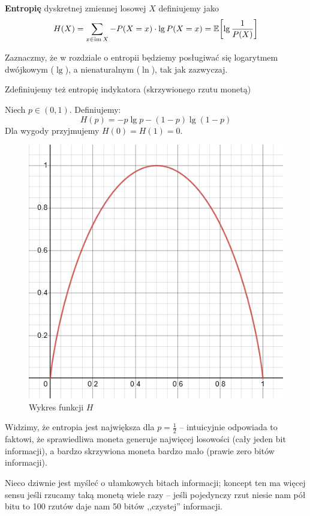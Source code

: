 \begin{definition}
	\textbf{Entropię} dyskretnej zmiennej losowej \( X\) definiujemy jako
	\[
		H(X) = \sum_{x \in \im X} -P(X = x) \cdot \lg P(X = x) = \expected{\lg \frac{1}{P(X)}}
	\]
\end{definition}
Zaznaczmy, że w rozdziale o entropii będziemy posługiwać się logarytmem dwójkowym (\( \lg \)), a nienaturalnym (\( \ln \)), tak jak zazwyczaj.

Zdefiniujemy też entropię indykatora (skrzywionego rzutu monetą)
\begin{definition}
	Niech \( p \in (0, 1) \). Definiujemy:
	\[
		H(p) = -p \lg p - (1-p) \lg (1-p)
	\]
	Dla wygody przyjmujemy \( H(0) = H(1) = 0 \).
\end{definition}
\begin{figure}[H]
	\centering
	\includegraphics[scale=0.5]{img/entropy/entropy-plot.png}
	\caption{Wykres funkcji \( H \)}
\end{figure}

Widzimy, że entropia jest największa dla \(p = \frac{1}{2} \) -- intuicyjnie odpowiada to faktowi, że sprawiedliwa moneta generuje najwięcej losowości (cały jeden bit informacji), a bardzo skrzywiona moneta bardzo mało (prawie zero bitów informacji).

Nieco dziwnie jest myśleć o ułamkowych bitach informacji; koncept ten ma więcej sensu jeśli rzucamy taką monetą wiele razy -- jeśli pojedynczy rzut niesie nam pół bitu to 100 rzutów daje nam 50 bitów ,,czystej'' informacji.

